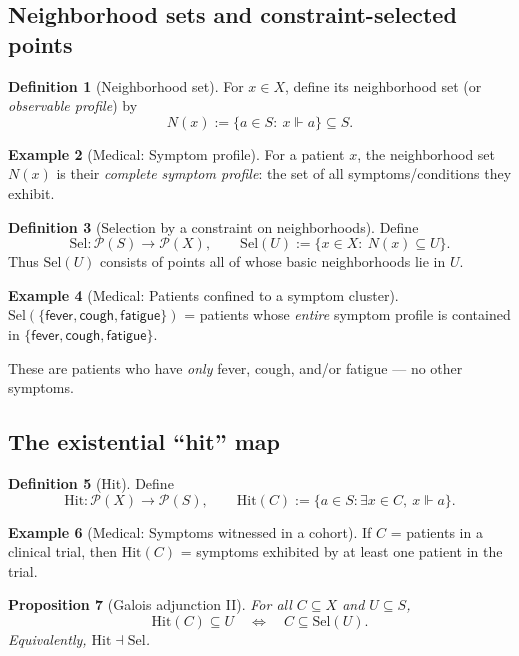 \documentclass[11pt]{article}
\theoremstyle{definition}
\newtheorem{definition}{Definition}[section]
\newtheorem{example}[definition]{Example}
\theoremstyle{plain}
\newtheorem{proposition}[definition]{Proposition}
\newcommand{\Pow}{\mathcal P}
\newcommand{\Hit}{\mathrm{Hit}}
\newcommand{\Sel}{\mathrm{Sel}}
\newcommand{\forces}{\Vdash}
\begin{document}
\subsection{Neighborhood sets and constraint-selected points}

\begin{definition}[Neighborhood set]
For $x\in X$, define its neighborhood set (or \emph{observable profile}) by
\[
N(x):=\{a\in S:\ x\forces a\}\subseteq S.
\]
\end{definition}

\begin{example}[Medical: Symptom profile]
For a patient $x$, the neighborhood set $N(x)$ is their \emph{complete symptom profile}:
the set of all symptoms/conditions they exhibit.
\end{example}

\begin{definition}[Selection by a constraint on neighborhoods]
Define
\[
\Sel:\Pow(S)\to\Pow(X),\qquad
\Sel(U):=\{x\in X:\ N(x)\subseteq U\}.
\]
Thus $\Sel(U)$ consists of points all of whose basic neighborhoods lie in $U$.
\end{definition}

\begin{example}[Medical: Patients confined to a symptom cluster]
$\Sel(\{\mathsf{fever}, \mathsf{cough}, \mathsf{fatigue}\})$ = patients whose \emph{entire} symptom profile
is contained in $\{\mathsf{fever}, \mathsf{cough}, \mathsf{fatigue}\}$.

These are patients who have \emph{only} fever, cough, and/or fatigue --- no other symptoms.
\end{example}

\subsection{The existential ``hit'' map}

\begin{definition}[Hit]
Define
\[
\Hit:\Pow(X)\to\Pow(S),\qquad
\Hit(C):=\{a\in S:\exists x\in C,\ x\forces a\}.
\]
\end{definition}

\begin{example}[Medical: Symptoms witnessed in a cohort]
If $C$ = patients in a clinical trial, then $\Hit(C)$ = symptoms exhibited by at least one patient in the trial.
\end{example}

\begin{proposition}[Galois adjunction II]
For all $C\subseteq X$ and $U\subseteq S$,
\[
\Hit(C)\subseteq U \quad\Longleftrightarrow\quad C\subseteq \Sel(U).
\]
Equivalently, $\Hit\dashv \Sel$.
\end{proposition}
\end{document}
